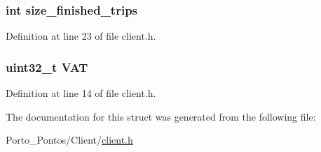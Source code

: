 \subsubsection[{size\+\_\+finished\+\_\+trips}]{\setlength{\rightskip}{0pt plus 5cm}int size\+\_\+finished\+\_\+trips}\label{structclient_aaf9c7a0f87d5d6b722051ed9a079938a}


Definition at line 23 of file client.\+h.

\hypertarget{structclient_a2fd75feb9757f443ce12debf7274df85}{}
\subsubsection[{V\+A\+T}]{\setlength{\rightskip}{0pt plus 5cm}uint32\+\_\+t V\+A\+T}\label{structclient_a2fd75feb9757f443ce12debf7274df85}


Definition at line 14 of file client.\+h.



The documentation for this struct was generated from the following file\+:\begin{DoxyCompactItemize}
\item 
Porto\+\_\+\+Pontos/\+Client/\hyperlink{client_8h}{client.\+h}\end{DoxyCompactItemize}
